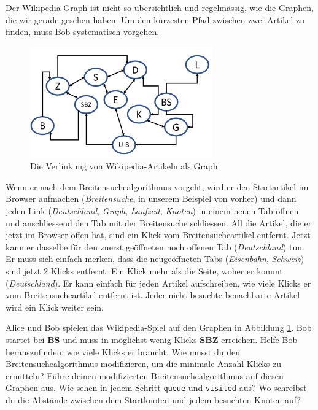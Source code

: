 Der Wikipedia-Graph ist nicht so übersichtlich und regelmässig, wie die Graphen, die wir gerade gesehen haben. Um den kürzesten Pfad zwischen zwei Artikel zu finden, muss Bob systematisch vorgehen. 
\begin{figure}[H]
    \centering
    \includegraphics[width=0.7\textwidth]{Pictures/Wikipedia.PNG} 
    \caption{Die Verlinkung von Wikipedia-Artikeln als Graph.}
    \label{fig:wikipedia_graph}
\end{figure}

Wenn er nach dem Breitensuchealgorithmus vorgeht, wird er den Startartikel im Browser aufmachen (\textit{Breitensuche}, in unserem Beispiel von vorher) und dann jeden Link (\textit{Deutschland}, \textit{Graph}, \textit{Laufzeit}, \textit{Knoten}) in einem neuen Tab öffnen und anschliessend den Tab mit der Breitensuche schliessen. All die Artikel, die er jetzt im Browser offen hat, sind ein Klick vom Breitensucheartikel entfernt. Jetzt kann er dasselbe für den zuerst geöffneten noch offenen Tab (\textit{Deutschland}) tun. Er muss sich einfach merken, dass die neugeöffneten Tabs (\textit{Eisenbahn}, \textit{Schweiz}) sind jetzt 2 Klicks entfernt: Ein Klick mehr als die Seite, woher er kommt (\textit{Deutschland}). Er kann einfach für jeden Artikel aufschreiben, wie viele Klicks er vom Breitensucheartikel entfernt ist. Jeder nicht besuchte benachbarte Artikel wird ein Klick weiter sein.

\begin{aufgabe}\label{aufgabe_wikipedia_spiel}
Alice und Bob spielen das Wikipedia-Spiel auf den Graphen in Abbildung \ref{fig:wikipedia_graph}. Bob startet bei \textbf{BS} und muss in möglichst wenig Klicks \textbf{SBZ} erreichen. Helfe Bob herauszufinden, wie viele Klicks er braucht. Wie musst du den Breitensuchealgorithmus modifizieren, um die minimale Anzahl Klicks zu ermitteln? Führe deinen modifizierten Breitensuchealgorithmus auf diesen Graphen aus. Wie sehen in jedem Schritt \texttt{queue} und \texttt{visited} aus? Wo schreibst du die Abstände zwischen dem Startknoten und jedem besuchten Knoten auf?
\end{aufgabe}


